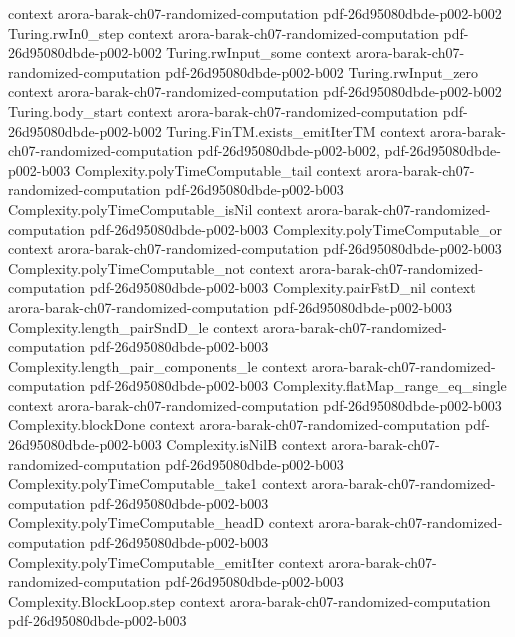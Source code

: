 \begin{theorem}
  {context}
  {arora-barak-ch07-randomized-computation}
  {pdf-26d95080dbde-p002-b002}
\proofstep
  {Turing.rwIn0_step}
  {context}
  {arora-barak-ch07-randomized-computation}
  {pdf-26d95080dbde-p002-b002}
\proofstep
  {Turing.rwInput_some}
  {context}
  {arora-barak-ch07-randomized-computation}
  {pdf-26d95080dbde-p002-b002}
\proofstep
  {Turing.rwInput_zero}
  {context}
  {arora-barak-ch07-randomized-computation}
  {pdf-26d95080dbde-p002-b002}
\proofstep
  {Turing.body_start}
  {context}
  {arora-barak-ch07-randomized-computation}
  {pdf-26d95080dbde-p002-b002}
\proofstep
  {Turing.FinTM.exists_emitIterTM}
  {context}
  {arora-barak-ch07-randomized-computation}
  {pdf-26d95080dbde-p002-b002,
    pdf-26d95080dbde-p002-b003}
\proofstep
  {Complexity.polyTimeComputable_tail}
  {context}
  {arora-barak-ch07-randomized-computation}
  {pdf-26d95080dbde-p002-b003}
\proofstep
  {Complexity.polyTimeComputable_isNil}
  {context}
  {arora-barak-ch07-randomized-computation}
  {pdf-26d95080dbde-p002-b003}
\proofstep
  {Complexity.polyTimeComputable_or}
  {context}
  {arora-barak-ch07-randomized-computation}
  {pdf-26d95080dbde-p002-b003}
\proofstep
  {Complexity.polyTimeComputable_not}
  {context}
  {arora-barak-ch07-randomized-computation}
  {pdf-26d95080dbde-p002-b003}
\proofstep
  {Complexity.pairFstD_nil}
  {context}
  {arora-barak-ch07-randomized-computation}
  {pdf-26d95080dbde-p002-b003}
\proofstep
  {Complexity.length_pairSndD_le}
  {context}
  {arora-barak-ch07-randomized-computation}
  {pdf-26d95080dbde-p002-b003}
\proofstep
  {Complexity.length_pair_components_le}
  {context}
  {arora-barak-ch07-randomized-computation}
  {pdf-26d95080dbde-p002-b003}
\proofstep
  {Complexity.flatMap_range_eq_single}
  {context}
  {arora-barak-ch07-randomized-computation}
  {pdf-26d95080dbde-p002-b003}
\proofstep
  {Complexity.blockDone}
  {context}
  {arora-barak-ch07-randomized-computation}
  {pdf-26d95080dbde-p002-b003}
\proofstep
  {Complexity.isNilB}
  {context}
  {arora-barak-ch07-randomized-computation}
  {pdf-26d95080dbde-p002-b003}
\proofstep
  {Complexity.polyTimeComputable_take1}
  {context}
  {arora-barak-ch07-randomized-computation}
  {pdf-26d95080dbde-p002-b003}
\proofstep
  {Complexity.polyTimeComputable_headD}
  {context}
  {arora-barak-ch07-randomized-computation}
  {pdf-26d95080dbde-p002-b003}
\proofstep
  {Complexity.polyTimeComputable_emitIter}
  {context}
  {arora-barak-ch07-randomized-computation}
  {pdf-26d95080dbde-p002-b003}
\proofstep
  {Complexity.BlockLoop.step}
  {context}
  {arora-barak-ch07-randomized-computation}
  {pdf-26d95080dbde-p002-b003}

\end{theorem}
